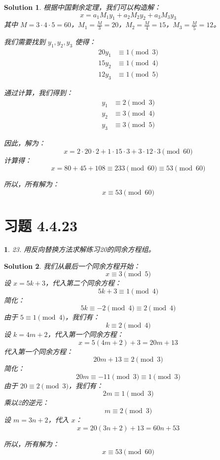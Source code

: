 \documentclass[UTF8]{report}
\newtheorem{solution}{Solution}
\theoremstyle{MyLineTheoremStyle} %
\theoremstyle{MyBlockTheoremStyle} %
\theoremstyle{MySubsubsectionStyle} %
\newtheorem{definition}{}
\begin{document}
\begin{solution}
    根据中国剩余定理，我们可以构造解：
    \[
    x = a_1 M_1 y_1 + a_2 M_2 y_2 + a_3 M_3 y_3
    \]
    其中 \( M = 3 \cdot 4 \cdot 5 = 60 \)，\( M_1 = \frac{M}{3} = 20 \)，\( M_2 = \frac{M}{4} = 15 \)，\( M_3 = \frac{M}{5} = 12 \)。

    我们需要找到 \( y_1, y_2, y_3 \) 使得：
    \[
    \begin{aligned}
        20y_1 &\equiv 1 \pmod{3} \\
        15y_2 &\equiv 1 \pmod{4} \\
        12y_3 &\equiv 1 \pmod{5}
    \end{aligned}
    \]

    通过计算，我们得到：
    \[
    \begin{aligned}
        y_1 &\equiv 2 \pmod{3} \\
        y_2 &\equiv 3 \pmod{4} \\
        y_3 &\equiv 3 \pmod{5}
    \end{aligned}
    \]

    因此，解为：
    \[
    x = 2 \cdot 20 \cdot 2 + 1 \cdot 15 \cdot 3 + 3 \cdot 12 \cdot 3 \pmod{60}
    \]
    计算得：
    \[
    x = 80 + 45 + 108 \equiv 233 \pmod{60} \equiv 53 \pmod{60}
    \]

    所以，所有解为：
    \[
    x \equiv 53 \pmod{60}
    \]
\end{solution}

\section{习题 4.4.23}

\begin{definition}
    23. 用反向替换方法求解练习20的同余方程组。
\end{definition}

\begin{solution}
    我们从最后一个同余方程开始：
    \[
    x \equiv 3 \pmod{5}
    \]
    设 \( x = 5k + 3 \)，代入第二个同余方程：
    \[
    5k + 3 \equiv 1 \pmod{4}
    \]
    简化：
    \[
    5k \equiv -2 \pmod{4} \equiv 2 \pmod{4}
    \]
    由于 \( 5 \equiv 1 \pmod{4} \)，我们有：
    \[
    k \equiv 2 \pmod{4}
    \]
    设 \( k = 4m + 2 \)，代入第一个同余方程：
    \[
    x = 5(4m + 2) + 3 = 20m + 13
    \]
    代入第一个同余方程：
    \[
    20m + 13 \equiv 2 \pmod{3}
    \]
    简化：
    \[
    20m \equiv -11 \pmod{3} \equiv 1 \pmod{3}
    \]
    由于 \( 20 \equiv 2 \pmod{3} \)，我们有：
    \[
    2m \equiv 1 \pmod{3}
    \]
    乘以2的逆元：
    \[
    m \equiv 2 \pmod{3}
    \]
    设 \( m = 3n + 2 \)，代入 \( x \)：
    \[
    x = 20(3n + 2) + 13 = 60n + 53
    \]

    所以，所有解为：
    \[
    x \equiv 53 \pmod{60}
    \]
\end{solution}
\end{document}
